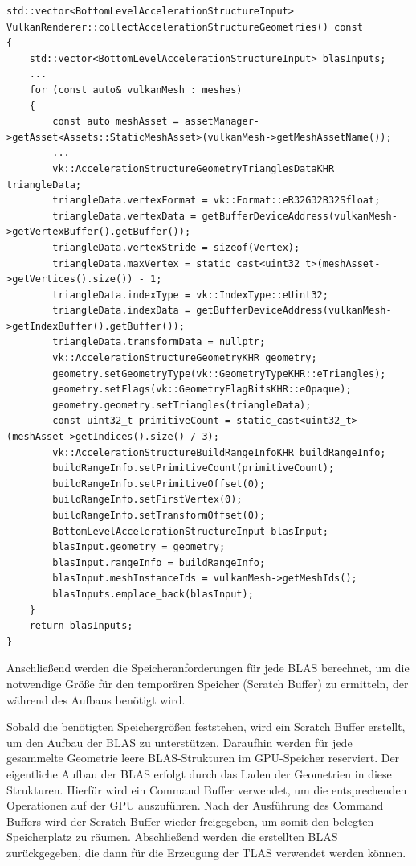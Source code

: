 \documentclass[11pt]{scrartcl}
\begin{document}
	\begin{lstlisting}[caption={Sammeln der 3D-Modellgeometrie in VulkanRenderer.cpp},label={lst:listing-vulkan-collectiongeocpp}]
std::vector<BottomLevelAccelerationStructureInput> VulkanRenderer::collectAccelerationStructureGeometries() const
{
	std::vector<BottomLevelAccelerationStructureInput> blasInputs;
	...
	for (const auto& vulkanMesh : meshes)
	{
		const auto meshAsset = assetManager->getAsset<Assets::StaticMeshAsset>(vulkanMesh->getMeshAssetName());
		...
		vk::AccelerationStructureGeometryTrianglesDataKHR triangleData;
		triangleData.vertexFormat = vk::Format::eR32G32B32Sfloat;
		triangleData.vertexData = getBufferDeviceAddress(vulkanMesh->getVertexBuffer().getBuffer());
		triangleData.vertexStride = sizeof(Vertex);
		triangleData.maxVertex = static_cast<uint32_t>(meshAsset->getVertices().size()) - 1;
		triangleData.indexType = vk::IndexType::eUint32;
		triangleData.indexData = getBufferDeviceAddress(vulkanMesh->getIndexBuffer().getBuffer());
		triangleData.transformData = nullptr;
		vk::AccelerationStructureGeometryKHR geometry;
		geometry.setGeometryType(vk::GeometryTypeKHR::eTriangles);
		geometry.setFlags(vk::GeometryFlagBitsKHR::eOpaque);
		geometry.geometry.setTriangles(triangleData);
		const uint32_t primitiveCount = static_cast<uint32_t>(meshAsset->getIndices().size() / 3);
		vk::AccelerationStructureBuildRangeInfoKHR buildRangeInfo;
		buildRangeInfo.setPrimitiveCount(primitiveCount);
		buildRangeInfo.setPrimitiveOffset(0);
		buildRangeInfo.setFirstVertex(0);
		buildRangeInfo.setTransformOffset(0);
		BottomLevelAccelerationStructureInput blasInput;
		blasInput.geometry = geometry;
		blasInput.rangeInfo = buildRangeInfo;
		blasInput.meshInstanceIds = vulkanMesh->getMeshIds();
		blasInputs.emplace_back(blasInput);
	}
	return blasInputs;
}	\end{lstlisting}
	
	Anschließend werden die Speicheranforderungen für jede BLAS berechnet, um die notwendige Größe für den temporären Speicher (Scratch Buffer) zu ermitteln, der während des Aufbaus benötigt wird.
	
	Sobald die benötigten Speichergrößen feststehen, wird ein Scratch Buffer erstellt, um den Aufbau der BLAS zu unterstützen. Daraufhin werden für jede gesammelte Geometrie leere BLAS-Strukturen im GPU-Speicher reserviert. Der eigentliche Aufbau der BLAS erfolgt durch das Laden der Geometrien in diese Strukturen. Hierfür wird ein Command Buffer verwendet, um die entsprechenden Operationen auf der GPU auszuführen. Nach der Ausführung des Command Buffers wird der Scratch Buffer wieder freigegeben, um somit den belegten Speicherplatz zu räumen. Abschließend werden die erstellten BLAS zurückgegeben, die dann für die Erzeugung der TLAS verwendet werden können.
	
\end{document}
